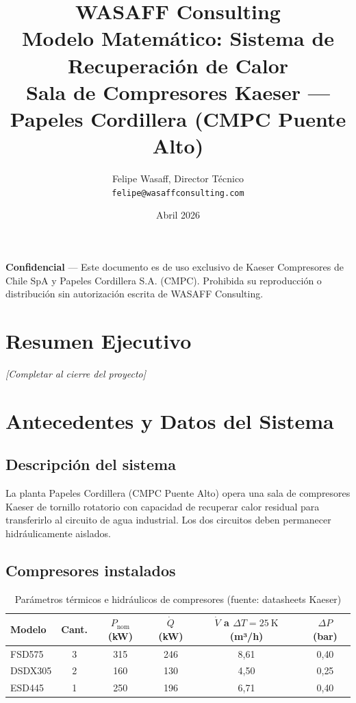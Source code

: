 \documentclass[12pt, letterpaper]{article}
\title{
  \vspace{-1cm}
  {\large \textbf{WASAFF Consulting}} \\[0.3cm]
  {\LARGE Modelo Matemático: Sistema de Recuperación de Calor} \\[0.2cm]
  {\large Sala de Compresores Kaeser --- Papeles Cordillera (CMPC Puente Alto)}
}
\author{
  Felipe Wasaff, Director Técnico \\
  \small \texttt{felipe@wasaffconsulting.com}
}
\date{Abril 2026}
\begin{document}
\maketitle
\thispagestyle{empty}

\vspace{0.5cm}
\begin{center}
  \small
  \textbf{Confidencial} --- Este documento es de uso exclusivo de
  Kaeser Compresores de Chile SpA y Papeles Cordillera S.A. (CMPC).
  Prohibida su reproducción o distribución sin autorización escrita de WASAFF Consulting.
\end{center}

\tableofcontents
\newpage

\section{Resumen Ejecutivo}

\textit{[Completar al cierre del proyecto]}

\section{Antecedentes y Datos del Sistema}

\subsection{Descripción del sistema}

La planta Papeles Cordillera (CMPC Puente Alto) opera una sala de compresores
Kaeser de tornillo rotatorio con capacidad de recuperar calor residual para
transferirlo al circuito de agua industrial. Los dos circuitos deben permanecer
hidráulicamente aislados.

\subsection{Compresores instalados}

\begin{table}[H]
  \centering
  \caption{Parámetros térmicos e hidráulicos de compresores (fuente: datasheets Kaeser)}
  \label{tab:compresores}
  \begin{tabular}{lccccc}
    \toprule
    Modelo & Cant. & $P_\text{nom}$ (kW) & $\dot{Q}$ (kW) &
    $\dot{V}$ a $\Delta T=\SI{25}{\kelvin}$ (m³/h) & $\Delta P$ (bar) \\
    \midrule
    FSD575  & 3 & 315 & 246 & 8{,}61 & 0{,}40 \\
    DSDX305 & 2 & 160 & 130 & 4{,}50 & 0{,}25 \\
    ESD445  & 1 & 250 & 196 & 6{,}71 & 0{,}40 \\
    \bottomrule
  \end{tabular}
\end{table}
\end{document}
